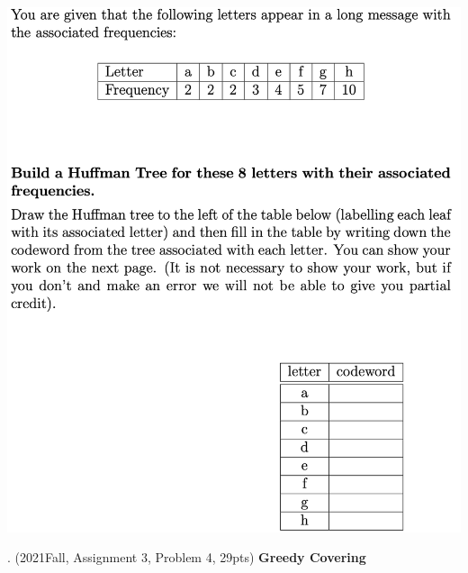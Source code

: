 \begin{spacing}{1.3}
    \includegraphics[scale=0.65]{images/07-exercise-2019s-huffman-question.png}

    . (2021Fall, Assignment 3, Problem 4, 29pts) {\bf Greedy Covering}


\end{spacing}
